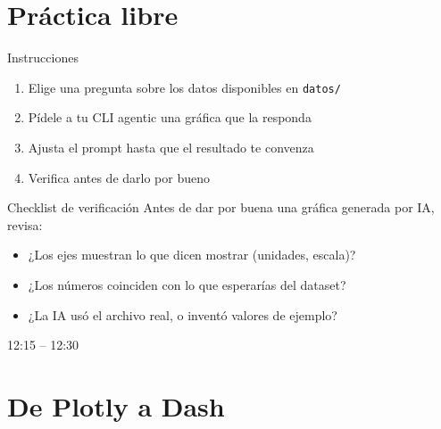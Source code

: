 \documentclass[light,minted=false]{cuzbeamer} %
\begin{document}
    \section{Práctica libre}

    \begin{frame}{Instrucciones}
        \begin{enumerate}
            \item Elige una pregunta sobre los datos disponibles en \texttt{datos/}
            \item Pídele a tu CLI agentic una gráfica que la responda
            \item Ajusta el prompt hasta que el resultado te convenza
            \item Verifica antes de darlo por bueno
        \end{enumerate}
    \end{frame}

    \begin{frame}{Checklist de verificación}
        Antes de dar por buena una gráfica generada por IA, revisa:
        \begin{itemize}
            \item ¿Los ejes muestran lo que dicen mostrar (unidades, escala)?
            \item ¿Los números coinciden con lo que esperarías del dataset?
            \item ¿La IA usó el archivo real, o inventó valores de ejemplo?
        \end{itemize}
    \end{frame}


    \begin{standout}
        12:15 -- 12:30
    \end{standout}

    \section{De Plotly a Dash}
\end{document}
